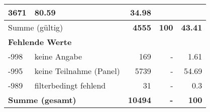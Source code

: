\begin{longtable}{lXrrr}
       \num{3671} &
       \num[round-mode=places,round-precision=2]{80,59} &
         \num[round-mode=places,round-precision=2]{34,98} \\
     \midrule
     \multicolumn{2}{l}{Summe (gültig)} &
       \textbf{\num{4555}} &
     \textbf{100} &
       \textbf{\num[round-mode=places,round-precision=2]{43,41}} \\
     \multicolumn{5}{l}{\textbf{Fehlende Werte}}\\
       -998 &
       keine Angabe &
         \num{169} &
        - &
         \num[round-mode=places,round-precision=2]{1,61} \\
       -995 &
       keine Teilnahme (Panel) &
         \num{5739} &
        - &
         \num[round-mode=places,round-precision=2]{54,69} \\
       -989 &
       filterbedingt fehlend &
         \num{31} &
        - &
         \num[round-mode=places,round-precision=2]{0,3} \\
     \midrule
     \multicolumn{2}{l}{\textbf{Summe (gesamt)}} &
          \textbf{\num{10494}} &
        \textbf{-} &
        \textbf{100} \\
     \bottomrule
     \end{longtable}
     
